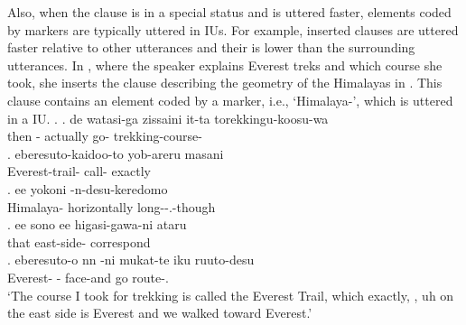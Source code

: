 Also,
when the clause is in a special status and is uttered faster,
elements coded by  markers are typically uttered in  IUs.
For example, inserted clauses are uttered faster relative to other utterances and their  is lower than the surrounding utterances.
In \Next, where the speaker explains Everest treks and which course she took,
she inserts the clause describing the geometry of the Himalayas in \Next[c].
This clause contains an element coded by a  marker, i.e.,  `Himalaya-',
which is uttered in a  IU.
%
\ex.\label{S01F0151_himaraya}
 \ag. de watasi-ga \tp{\dvline} zissaini \tp{\dvline} it-ta \tp{\dvline} torekkingu-koosu-wa \tp{\dvline} \\
 	then - {} actually {} go- {} trekking-course- {} \\
 \bg. eberesuto-kaidoo-to yob-areru \tp{\dvline} masani \tp{\dvline} \\
 	Everest-trail- call- {} exactly {} \\
 \bg. ee  yokoni -n-desu-keredomo \tp{\dvline} \\
 	 Himalaya- horizontally long--.-though {} \\
 \bg. ee sono \tp{\dvline} ee higasi-gawa-ni ataru \tp{\dvline} \\
 	 that {}  east-side- correspond {} \\
 \bg. eberesuto-o \tp{\dvline} nn -ni  mukat-te iku \tp{\dvline} ruuto-desu \\
 	Everest- {}  - face-and go {} route-. \\
	`The course I took for trekking is called the Everest Trail, which exactly, , uh on the east side is Everest and we walked toward Everest.'

